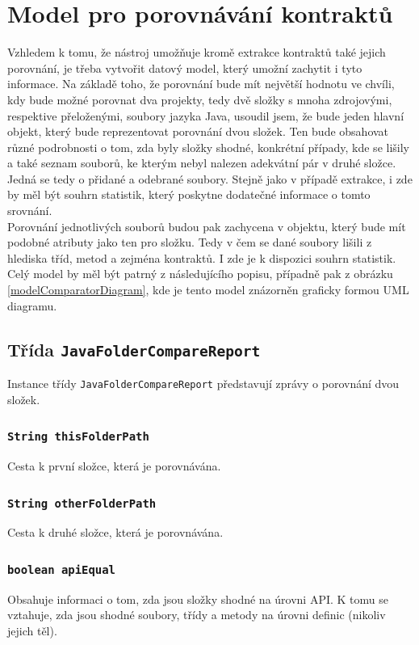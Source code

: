 	\section{Model pro porovnávání kontraktů}
		Vzhledem k tomu, že nástroj umožňuje kromě extrakce kontraktů také jejich porovnání, je třeba vytvořit datový model, který umožní zachytit i tyto informace. Na základě toho, že porovnání bude mít největší hodnotu ve chvíli, kdy bude možné porovnat dva projekty, tedy dvě složky s mnoha zdrojovými, respektive přeloženými, soubory jazyka Java, usoudil jsem, že bude jeden hlavní objekt, který bude reprezentovat porovnání dvou složek. Ten bude obsahovat různé podrobnosti o tom, zda byly složky shodné, konkrétní případy, kde se lišily a také seznam souborů, ke kterým nebyl nalezen adekvátní pár v druhé složce. Jedná se tedy o přidané a odebrané soubory. Stejně jako v případě extrakce, i zde by měl být souhrn statistik, který poskytne dodatečné informace o tomto srovnání.\\
		
		Porovnání jednotlivých souborů budou pak zachycena v objektu, který bude mít podobné atributy jako ten pro složku. Tedy v čem se dané soubory lišili z hlediska tříd, metod a zejména kontraktů. I zde je k dispozici souhrn statistik. Celý model by měl být patrný z následujícího popisu, případně pak z obrázku \ref{modelComparatorDiagram}, kde je tento model znázorněn graficky formou UML diagramu.
		
		\subsection{Třída \texttt{JavaFolderCompareReport}}
			Instance třídy \texttt{JavaFolderCompareReport} představují zprávy o porovnání dvou složek.
			
			\subsubsection{\texttt{String thisFolderPath}}
				Cesta k první složce, která je porovnávána.
				
			\subsubsection{\texttt{String otherFolderPath}}
				Cesta k druhé složce, která je porovnávána.
				
			\subsubsection{\texttt{boolean apiEqual}}
				Obsahuje informaci o tom, zda jsou složky shodné na úrovni API. K tomu se vztahuje, zda jsou shodné soubory, třídy a metody na úrovni definic (nikoliv jejich těl).
				
